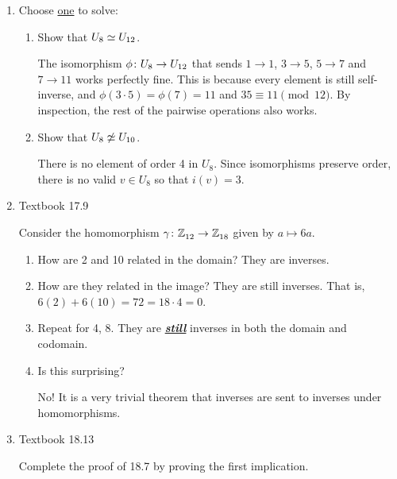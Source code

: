 \documentclass{article}
\begin{document}
\begin{enumerate}[start=1,label={(\arabic*)}]
\begin{enumerate}[start=1,label={(\alph*)}]
        \end{enumerate}


  \item Choose \underline{one} to solve:

        \begin{enumerate}[start=1,label={(\alph*)}]
          \item Show that $U_{8} \simeq U_{12}$.

                The isomorphism $\phi \colon U_{8} \to U_{12}$ that sends $1 \to 1$, $3 \to 5$, $5 \to 7$ and $7 \to 11$ works perfectly fine.
                This is because every element is still self-inverse, and $\phi(3 \cdot 5) = \phi(7) = 11$ and $35 \equiv 11 \pmod{12}$.
                By inspection, the rest of the pairwise operations also works.

          \item Show that $U_{8} \not\simeq U_{10}$.

                There is no element of order 4 in $U_{8}$.
                Since isomorphisms preserve order, there is no valid $v \in U_{8}$ so that $i(v) = 3$.
        \end{enumerate}

  \item Textbook 17.9

        Consider the homomorphism $\gamma \colon \mathbb{Z}^{}_{12} \to \mathbb{Z}^{}_{18}$ given by $a \mapsto 6a$.

        \begin{enumerate}[start=1,label={(\alph*)}]
          \item How are 2 and 10 related in the domain? They are inverses.

          \item How are they related in the image? They are still inverses. That is, $6(2) + 6(10) = 72 = 18 \cdot 4 = 0$.

          \item Repeat for 4, 8. They are \emph{\underline{\textbf{still}}} inverses in both the domain and codomain.

          \item Is this surprising?

                No! It is a very trivial theorem that inverses are sent to inverses under homomorphisms.
        \end{enumerate}


  \item Textbook 18.13

        Complete the proof of 18.7 by proving the first implication.


\end{enumerate}
\end{document}
